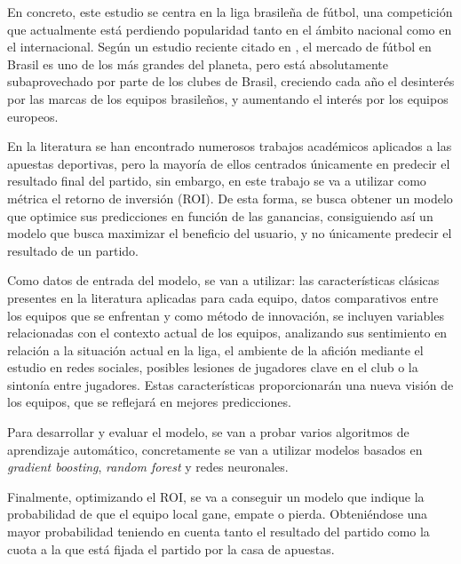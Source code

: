 En concreto, este estudio se centra en la liga brasileña de fútbol, una competición que actualmente está perdiendo popularidad tanto en el ámbito nacional como en el internacional. Según un estudio reciente citado en \cite{sportsvalue2025}, el mercado de fútbol en Brasil es uno de los más grandes del planeta, pero está absolutamente subaprovechado por parte de los clubes de Brasil, creciendo cada año el desinterés por las marcas de los equipos brasileños, y aumentando el interés por los equipos europeos.

En la literatura se han encontrado numerosos trabajos académicos aplicados a las apuestas deportivas, pero la mayoría de ellos centrados únicamente en predecir el resultado final del partido, sin embargo, en este trabajo se va a utilizar como métrica el retorno de inversión (ROI). De esta forma, se busca obtener un modelo que optimice sus predicciones en función de las ganancias, consiguiendo así un modelo que busca maximizar el beneficio del usuario, y no únicamente predecir el resultado de un partido.

Como datos de entrada del modelo, se van a utilizar: las características clásicas presentes en la literatura aplicadas para cada equipo, datos comparativos entre los equipos que se enfrentan y como método de innovación, se incluyen variables relacionadas con el contexto actual de los equipos, analizando sus sentimiento en relación a la situación actual en la liga, el ambiente de la afición mediante el estudio en redes sociales, posibles lesiones de jugadores clave en el club o la sintonía entre jugadores. Estas características proporcionarán una nueva visión de los equipos, que se reflejará en mejores predicciones.

Para desarrollar y evaluar el modelo, se van a probar varios algoritmos de aprendizaje automático, concretamente se van a utilizar modelos basados en \textit{gradient boosting}, \textit{random forest} y redes neuronales.

Finalmente, optimizando el ROI, se va a conseguir un modelo que indique la probabilidad de que el equipo local gane, empate o pierda. Obteniéndose una mayor probabilidad teniendo en cuenta tanto el resultado del partido como la cuota a la que está fijada el partido por la casa de apuestas.


